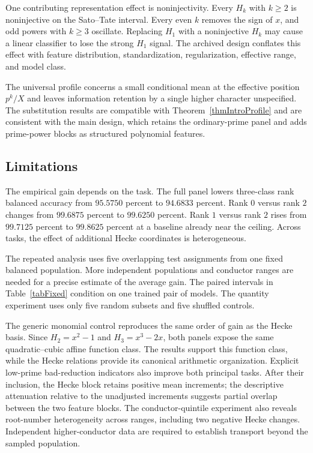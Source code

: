 \documentclass[12pt,reqno]{amsart}
\numberwithin{equation}{section}
\theoremstyle{plain}
\theoremstyle{definition}
\theoremstyle{remark}
\begin{document}
One contributing representation effect is noninjectivity.
Every $H_k$ with $k\geq2$ is noninjective on the Sato--Tate interval.
Every even $k$ removes the sign of $x$, and odd powers with $k\geq3$ oscillate.
Replacing $H_1$ with a noninjective $H_k$ may cause a linear classifier to lose the strong $H_1$ signal.
The archived design conflates this effect with feature distribution, standardization, regularization, effective range, and model class.

The universal profile concerns a small conditional mean at the effective position $p^k/X$ and leaves information retention by a single higher character unspecified.
The substitution results are compatible with Theorem~\ref{thmIntroProfile} and are consistent with the main design, which retains the ordinary-prime panel and adds prime-power blocks as structured polynomial features.

\subsection{Limitations}

The empirical gain depends on the task.
The full panel lowers three-class rank balanced accuracy from $95.5750$ percent to $94.6833$ percent.
Rank $0$ versus rank $2$ changes from $99.6875$
percent to $99.6250$ percent.
Rank $1$ versus rank $2$ rises from $99.7125$ percent to $99.8625$ percent at a baseline already near the ceiling.
Across tasks, the effect of additional Hecke coordinates is heterogeneous.

The repeated analysis uses five overlapping test assignments from one fixed balanced population.
More independent populations and conductor ranges are needed for a precise estimate of the average gain.
The paired intervals in Table~\ref{tabFixed} condition
on one trained pair of models.
The quantity experiment uses only five random subsets and five shuffled controls.

The generic monomial control reproduces the same order of gain as the Hecke basis.
Since $H_2=x^2-1$ and $H_3=x^3-2x$, both panels expose the same quadratic--cubic affine function class.
The results support this function class, while the Hecke relations provide its canonical arithmetic organization.
Explicit low-prime bad-reduction indicators also improve both principal tasks.
After their inclusion, the Hecke block retains positive mean increments; the descriptive attenuation relative to the unadjusted increments suggests partial overlap between the two feature blocks.
The conductor-quintile experiment also reveals root-number heterogeneity across ranges, including two negative Hecke changes.
Independent higher-conductor data are required to establish transport beyond the sampled population.
\end{document}
